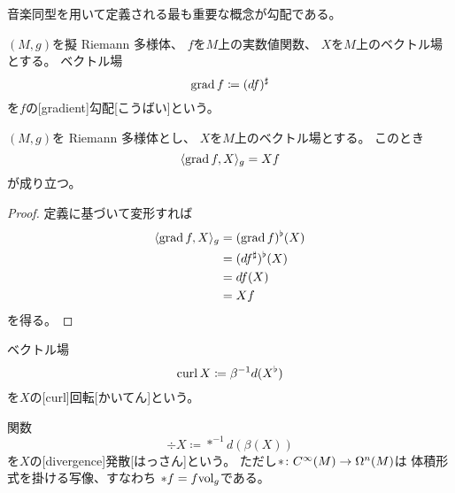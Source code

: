 \documentclass[report]{jlreq}
\begin{document}
音楽同型を用いて定義される最も重要な概念が勾配である。

\begin{definition}[勾配]
    $(M, g)$を擬 Riemann 多様体、
    $f$を$M$上の{\smooth}実数値関数、
    $X$を$M$上のベクトル場とする。
    ベクトル場
    \begin{equation}
        \operatorname{grad} f \coloneqq (df)^\sharp
    \end{equation}
    を$f$の[gradient]{勾配}[こうばい]という。
\end{definition}

\begin{proposition}[勾配の性質]
    $(M, g)$を Riemann 多様体とし、
    $X$を$M$上のベクトル場とする。
    このとき
    \begin{equation}
        \langle \operatorname{grad} f, X \rangle_g = Xf
    \end{equation}
    が成り立つ。
\end{proposition}

\begin{proof}
    定義に基づいて変形すれば
    \begin{alignat}{1}
        \langle \operatorname{grad} f, X \rangle_g
            &= (\operatorname{grad} f)^\flat (X) \\
            &= (df^\sharp)^\flat (X) \\
            &= df(X) \\
            &= Xf
    \end{alignat}
    を得る。
\end{proof}

\begin{definition}[回転]
    ベクトル場
    \begin{equation}
        \operatorname{curl} X \coloneqq \beta^{-1} d(X^\flat)
    \end{equation}
    を$X$の[curl]{回転}[かいてん]という。
    \TODO{}
\end{definition}


\begin{definition}[発散]
    関数
    \begin{equation}
        \div X \coloneqq *^{-1} d(\beta(X))
    \end{equation}
    を$X$の[divergence]{発散}[はっさん]という。
    ただし$* \colon C^\infty(M) \to \Omega^n(M)$は
    体積形式を掛ける写像、すなわち
    $*f = f \mathrm{vol}_g$である。
\end{definition}
\end{document}
